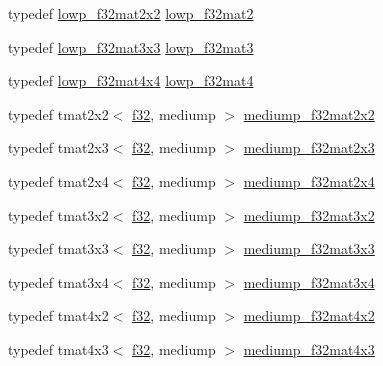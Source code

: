 \begin{DoxyCompactItemize}
\item 
typedef \hyperlink{namespaceglm_ab9e4eb16dafb8cb18d411490d8ccc611}{lowp\+\_\+f32mat2x2} \hyperlink{namespaceglm_ad717448ef1129d7b795ebcfee6c4944c}{lowp\+\_\+f32mat2}
\item 
typedef \hyperlink{namespaceglm_ab7d83082e77b2817c3dfcdcd9c432329}{lowp\+\_\+f32mat3x3} \hyperlink{namespaceglm_a84500ab23c0f0f3c585f8ad02f33b88c}{lowp\+\_\+f32mat3}
\item 
typedef \hyperlink{namespaceglm_a2cb18a3aae9d4e53dbae4554089cc056}{lowp\+\_\+f32mat4x4} \hyperlink{namespaceglm_ada4d11f44b410c1be7b6b1d05ccf692c}{lowp\+\_\+f32mat4}
\item 
typedef tmat2x2$<$ \hyperlink{group__gtc__type__precision_ga0ec999b57f5330d9021256e96038df04}{f32}, mediump $>$ \hyperlink{namespaceglm_a4b54e9273e523b0e07e5a0c92eb1ff9e}{mediump\+\_\+f32mat2x2}
\item 
typedef tmat2x3$<$ \hyperlink{group__gtc__type__precision_ga0ec999b57f5330d9021256e96038df04}{f32}, mediump $>$ \hyperlink{namespaceglm_a87464ba37fbed57b91088eef6ddf4df9}{mediump\+\_\+f32mat2x3}
\item 
typedef tmat2x4$<$ \hyperlink{group__gtc__type__precision_ga0ec999b57f5330d9021256e96038df04}{f32}, mediump $>$ \hyperlink{namespaceglm_ad26c2567ad37745ea5535bb0f312e254}{mediump\+\_\+f32mat2x4}
\item 
typedef tmat3x2$<$ \hyperlink{group__gtc__type__precision_ga0ec999b57f5330d9021256e96038df04}{f32}, mediump $>$ \hyperlink{namespaceglm_a6fcf8d00a3e0cca23e3eaaba24bf2dc3}{mediump\+\_\+f32mat3x2}
\item 
typedef tmat3x3$<$ \hyperlink{group__gtc__type__precision_ga0ec999b57f5330d9021256e96038df04}{f32}, mediump $>$ \hyperlink{namespaceglm_a40d94024c0ce48a6819a25d16a7955b7}{mediump\+\_\+f32mat3x3}
\item 
typedef tmat3x4$<$ \hyperlink{group__gtc__type__precision_ga0ec999b57f5330d9021256e96038df04}{f32}, mediump $>$ \hyperlink{namespaceglm_a18d2daa4d554564626732c485bab6cff}{mediump\+\_\+f32mat3x4}
\item 
typedef tmat4x2$<$ \hyperlink{group__gtc__type__precision_ga0ec999b57f5330d9021256e96038df04}{f32}, mediump $>$ \hyperlink{namespaceglm_a539da8e36a7d6bb5fe20d6458a99056e}{mediump\+\_\+f32mat4x2}
\item 
typedef tmat4x3$<$ \hyperlink{group__gtc__type__precision_ga0ec999b57f5330d9021256e96038df04}{f32}, mediump $>$ \hyperlink{namespaceglm_aba56c6b40c63228a05f2dcfe89caf336}{mediump\+\_\+f32mat4x3}
\item 

\end{DoxyCompactItemize}

